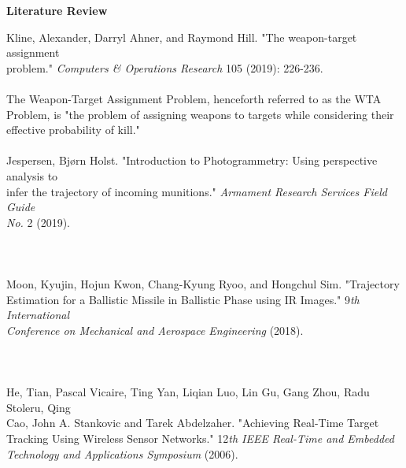 \documentclass[12pt]{article} %
\begin{document}
 
\begin{center}
\textbf{Literature Review}
\end{center}
\bigskip

\noindent
Kline, Alexander, Darryl Ahner, and Raymond Hill. "The weapon-target assignment\\
\indent problem." \textit{Computers \& Operations Research} 105 (2019): 226-236.\\
\vspace{0.5cm}\\
\indent The Weapon-Target Assignment Problem, henceforth referred to as the WTA Problem, is "the problem of assigning weapons to targets while considering their effective probability of kill."
\ \\ \vspace{0.5cm}\\

\noindent
Jespersen, Bjørn Holst. "Introduction to Photogrammetry: Using perspective analysis to\\
\indent infer the trajectory of incoming munitions." \textit{Armament Research Services Field Guide\\ \indent No.} 2 (2019).
\ \\ \vspace{0.5cm}\\

\ \\ \vspace{0.5cm}\\

\noindent
Moon, Kyujin, Hojun Kwon, Chang-Kyung Ryoo, and Hongchul Sim. "Trajectory\\
\indent Estimation for a Ballistic Missile in Ballistic Phase using IR Images." 9\textit{th International
\\ \indent Conference on Mechanical and Aerospace Engineering} (2018).
\ \\ \vspace{0.5cm}\\

\ \\ \vspace{0.5cm}\\
\noindent
He, Tian, Pascal Vicaire, Ting Yan, Liqian Luo, Lin Gu, Gang Zhou,
Radu Stoleru, Qing\\
\indent Cao, John A. Stankovic and Tarek Abdelzaher. "Achieving Real-Time Target\\
\indent Tracking Using Wireless Sensor Networks." 12\textit{th IEEE Real-Time and Embedded\\
\indent Technology and Applications Symposium} (2006).
\ \\ \vspace{0.5cm}\\
\end{document}
